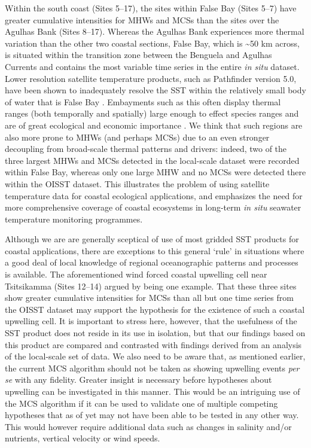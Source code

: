 \documentclass[a4paper,10pt,review]{elsarticle}
\begin{document}
Within the south coast (Sites 5--17), the sites within False Bay (Sites 5--7) have greater cumulative intensities for MHWs and MCSs than the sites over the Agulhas Bank (Sites 8--17). Whereas the Agulhas Bank experiences more thermal variation than the other two coastal sections, False Bay, which is \textasciitilde50 km across, is situated within the transition zone between the Benguela and Agulhas Currents \citep{Smit2013} and contains the most variable time series in the entire \emph{in situ} dataset. Lower resolution satellite temperature products, such as Pathfinder version 5.0, have been shown to inadequately resolve the SST within the relatively small body of water that is False Bay \citep{Dufois2012}. Embayments such as this often display thermal ranges (both temporally and spatially) large enough to effect species ranges \citep{Ling2009} and are of great ecological \citep{Klumb2003} and economic importance \citep{Lugendo2005}. We think that such regions are also more prone to MHWs (and perhaps MCSs) due to an even stronger decoupling from broad-scale thermal patterns and drivers: indeed, two of the three largest MHWs and MCSs detected in the local-scale dataset were recorded within False Bay, whereas only one large MHW and no MCSs were detected there within the OISST dataset. This illustrates the problem of using satellite temperature data for coastal ecological applications, and emphasizes the need for more comprehensive coverage of coastal ecosystems in long-term \emph{in situ} seawater temperature monitoring programmes.

Although we are are generally sceptical of use of most gridded SST products for coastal applications, there are exceptions to this general `rule' in situations where a good deal of local knowledge of regional oceanographic patterns and processes is available. The aforementioned wind forced coastal upwelling cell near Tsitsikamma (Sites 12--14) argued by \citet{Roberts2005} being one example. That these three sites show greater cumulative intensities for MCSs than all but one time series from the OISST dataset may support the hypothesis for the existence of such a coastal upwelling cell. It is important to stress here, however, that the usefulness of the SST product does not reside in its use in isolation, but that our findings based on this product are compared and contrasted with findings derived from an analysis of the local-scale set of data. We also need to be aware that, as mentioned earlier, the current MCS algorithm should not be taken as showing upwelling events \emph{per se} with any fidelity. Greater insight is necessary before hypotheses about upwelling can be investigated in this manner. This would be an intriguing use of the MCS algorithm if it can be used to validate one of multiple competing hypotheses that as of yet may not have been able to be tested in any other way. This would however require additional data such as changes in salinity and/or nutrients, vertical velocity or wind speeds.
\end{document}

